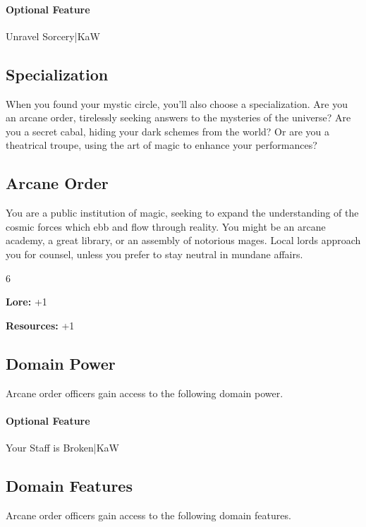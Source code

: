 \documentclass[10pt,a4paper,twoside,bg=print,twocolumn,openany,nodeprecatedcode]{dndbook}
\begin{document}
\paragraph{Optional Feature}
Unravel Sorcery|KaW

\subsection{Specialization}
When you found your mystic circle, you'll also choose a specialization. Are you an arcane order, tirelessly seeking answers to the mysteries of the universe? Are you a secret cabal, hiding your dark schemes from the world? Or are you a theatrical troupe, using the art of magic to enhance your performances?

\subsection{Arcane Order}
You are a public institution of magic, seeking to expand the understanding of the cosmic forces which ebb and flow through reality. You might be an arcane academy, a great library, or an assembly of notorious mages. Local lords approach you for counsel, unless you prefer to stay neutral in mundane affairs.

{\par \vspace { 9pt plus 3pt minus 3pt } \noindent  {} \nopagebreak }

\begin{itemize}
\begin{multicols}{6}
\item \textbf{Lore:} +1
\item \textbf{Resources:} +1
\end{multicols}

\end{itemize}

\subsection{Domain Power}
Arcane order officers gain access to the following domain power.

\paragraph{Optional Feature}
Your Staff is Broken|KaW

\subsection{Domain Features}
Arcane order officers gain access to the following domain features.
\end{document}
